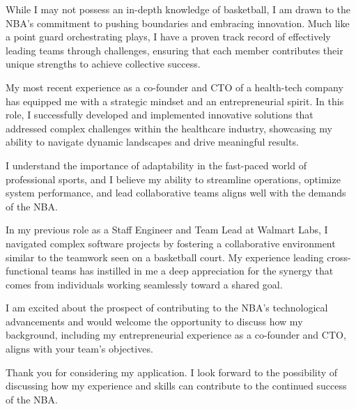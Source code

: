\documentclass[11pt, a4paper]{awesome-cv}
\begin{document}
\begin{cvletter}

  While I may not possess an in-depth knowledge of basketball, I am drawn to the NBA's commitment to pushing boundaries and embracing innovation. Much like a point guard orchestrating plays, I have a proven track record of effectively leading teams through challenges, ensuring that each member contributes their unique strengths to achieve collective success.

  My most recent experience as a co-founder and CTO of a health-tech company has equipped me with a strategic mindset and an entrepreneurial spirit. In this role, I successfully developed and implemented innovative solutions that addressed complex challenges within the healthcare industry, showcasing my ability to navigate dynamic landscapes and drive meaningful results.

  I understand the importance of adaptability in the fast-paced world of professional sports, and I believe my ability to streamline operations, optimize system performance, and lead collaborative teams aligns well with the demands of the NBA.


  In my previous role as a Staff Engineer and Team Lead at Walmart Labs, I navigated complex software projects by fostering a collaborative environment similar to the teamwork seen on a basketball court. My experience leading cross-functional teams has instilled in me a deep appreciation for the synergy that comes from individuals working seamlessly toward a shared goal.

  I am excited about the prospect of contributing to the NBA's technological advancements and would welcome the opportunity to discuss how my background, including my entrepreneurial experience as a co-founder and CTO, aligns with your team's objectives.

  Thank you for considering my application. I look forward to the possibility of discussing how my experience and skills can contribute to the continued success of the NBA.

\end{cvletter}


\makeletterclosing
\end{document}
